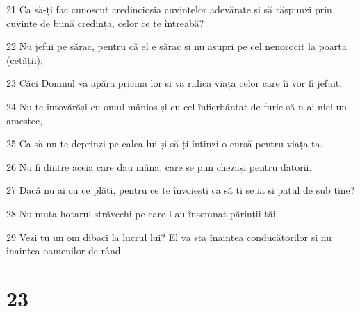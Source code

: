 \par 21 Ca să-ți fac cunoscut credincioșia cuvintelor adevărate și să răspunzi prin cuvinte de bună credință, celor ce te întreabă?
\par 22 Nu jefui pe sărac, pentru că el e sărac și nu asupri pe cel nenorocit la poarta (cetății),
\par 23 Căci Domnul va apăra pricina lor și va ridica viața celor care îi vor fi jefuit.
\par 24 Nu te întovărăși cu omul mânios și cu cel înfierbântat de furie să n-ai nici un amestec,
\par 25 Ca să nu te deprinzi pe calea lui și să-ți întinzi o cursă pentru viața ta.
\par 26 Nu fi dintre aceia care dau mâna, care se pun chezași pentru datorii.
\par 27 Dacă nu ai cu ce plăti, pentru ce te învoiești ca să ți se ia și patul de sub tine?
\par 28 Nu muta hotarul străvechi pe care l-au însemnat părinții tăi.
\par 29 Vezi tu un om dibaci la lucrul lui? El va sta înaintea conducătorilor și nu înaintea oamenilor de rând.

\chapter{23}

